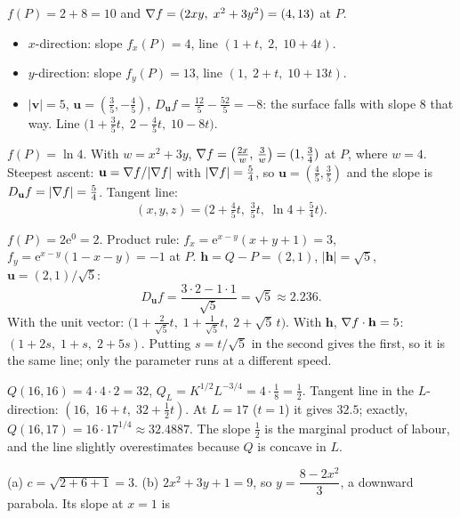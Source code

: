 \begin{solutions}
  \item $f(P)=2+8=10$ and $\nabla f=(2xy,\;x^{2}+3y^{2})=(4,13)$ at $P$.
        \begin{itemize}[leftmargin=1.2em,itemsep=0.2ex]
          \item $x$-direction: slope $f_{x}(P)=4$, line
                $(1+t,\;2,\;10+4t)$.
          \item $y$-direction: slope $f_{y}(P)=13$, line
                $(1,\;2+t,\;10+13t)$.
          \item $|\mathbf{v}|=5$, $\mathbf{u}=(\tfrac35,-\tfrac45)$,
                $D_{\mathbf{u}}f=\tfrac{12}{5}-\tfrac{52}{5}=-8$: the
                surface falls with slope $8$ that way. Line
                $\bigl(1+\tfrac35t,\;2-\tfrac45t,\;10-8t\bigr)$.
        \end{itemize}
  \item $f(P)=\ln4$. With $w=x^{2}+3y$, $\nabla f=\bigl(\tfrac{2x}{w},\,
        \tfrac{3}{w}\bigr)=(1,\tfrac34)$ at $P$, where $w=4$. Steepest
        ascent: $\mathbf{u}=\nabla f/|\nabla f|$ with $|\nabla f|=\tfrac54$, so
        $\mathbf{u}=(\tfrac45,\tfrac35)$ and the slope is
        $D_{\mathbf{u}}f=|\nabla f|=\tfrac54$. Tangent line:
        \[
          (x,y,z)=\bigl(2+\tfrac45t,\;\tfrac35t,\;\ln4+\tfrac54t\bigr) .
        \]
  \item $f(P)=2\mathrm{e}^{0}=2$. Product rule:
        $f_{x}=\mathrm{e}^{x-y}(x+y+1)=3$,
        $f_{y}=\mathrm{e}^{x-y}(1-x-y)=-1$ at $P$. $\mathbf{h}=Q-P=(2,1)$,
        $|\mathbf{h}|=\sqrt5$, $\mathbf{u}=(2,1)/\sqrt5$:
        \[
          D_{\mathbf{u}}f=\frac{3\cdot2-1\cdot1}{\sqrt5}=\sqrt5\approx2.236 .
        \]
        With the unit vector:
        $\bigl(1+\tfrac{2}{\sqrt5}t,\;1+\tfrac{1}{\sqrt5}t,\;2+\sqrt5\,t\bigr)$.
        With $\mathbf{h}$, $\nabla f\cdot\mathbf{h}=5$:
        $(1+2s,\;1+s,\;2+5s)$. Putting $s=t/\sqrt5$ in the second gives the
        first, so it is the same line; only the parameter runs at a
        different speed.
  \item $Q(16,16)=4\cdot4\cdot2=32$,
        $Q_{L}=K^{1/2}L^{-3/4}=4\cdot\tfrac18=\tfrac12$. Tangent line in the
        $L$-direction: $(16,\;16+t,\;32+\tfrac12t)$. At $L=17$ ($t=1$) it
        gives $32.5$; exactly, $Q(16,17)=16\cdot17^{1/4}\approx32.4887$. The
        slope $\tfrac12$ is the marginal product of labour, and the line
        slightly overestimates because $Q$ is concave in $L$.
  \item (a) $c=\sqrt{2+6+1}=3$. (b) $2x^{2}+3y+1=9$, so
        $y=\dfrac{8-2x^{2}}{3}$, a downward parabola. Its slope at $x=1$ is

\end{solutions}
